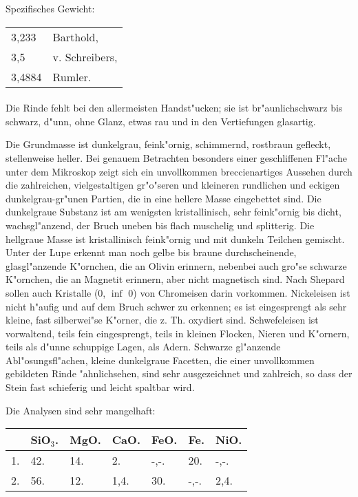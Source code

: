 \documentclass[a4paper, 11pt, oneside]{article}
\begin{document}
Spezifisches Gewicht:
\begin{table}[!ht]
    \centering
    \begin{tabular}{l l}
        3,233 & Barthold,\\
        3,5 & v. Schreibers,\\
        3,4884 & Rumler.
    \end{tabular}
\end{table}
\paragraph{}
Die Rinde fehlt bei den allermeisten Handst"ucken; sie ist br"aunlichschwarz bis schwarz, d"unn, ohne Glanz, etwas rau und in den Vertiefungen glasartig.

Die Grundmasse ist dunkelgrau, feink"ornig, schimmernd, rostbraun gefleckt, stellenweise heller. Bei genauem Betrachten besonders einer geschliffenen Fl"ache unter dem Mikroskop zeigt sich ein unvollkommen breccienartiges Aussehen durch die zahlreichen, vielgestaltigen gr"o"seren und kleineren rundlichen und eckigen dunkelgrau-gr"unen Partien, die in eine hellere Masse eingebettet sind. Die dunkelgraue Substanz ist am wenigsten kristallinisch, sehr feink"ornig bis dicht, wachsgl"anzend, der Bruch uneben bis flach muschelig und splitterig. Die hellgraue Masse ist kristallinisch feink"ornig und mit dunkeln Teilchen gemischt. Unter der Lupe erkennt man noch gelbe bis braune durchscheinende, glasgl"anzende K"ornchen, die an Olivin erinnern, nebenbei auch gro"se schwarze K"ornchen, die an Magnetit erinnern, aber nicht magnetisch sind. Nach Shepard sollen auch Kristalle (0, $\inf$ 0) von Chromeisen darin vorkommen. Nickeleisen ist nicht h"aufig und auf dem Bruch schwer zu erkennen; es ist eingesprengt als sehr kleine, fast silberwei"se K"orner, die z. Th. oxydiert sind. Schwefeleisen ist vorwaltend, teils fein eingesprengt, teils in kleinen Flocken, Nieren und K"ornern, teils als d"unne schuppige Lagen, als Adern. Schwarze gl"anzende Abl"osungsfl"achen, kleine dunkelgraue Facetten, die einer unvollkommen gebildeten Rinde "ahnlichsehen, sind sehr ausgezeichnet und zahlreich, so dass der Stein fast schieferig und leicht spaltbar wird.

Die Analysen sind sehr mangelhaft:
\begin{table}[!ht]
    \centering
    \begin{tabular}{l l l l l l l}
         & SiO$_{3}$. & MgO. & CaO. & FeO. & Fe. & NiO.\\ \hline
        1. & 42. & 14. & 2. & -,-. & 20. & -,-. \\
        2. & 56. & 12. & 1,4. & 30. & -,-. & 2,4. \\
    \end{tabular}
\end{table}
\end{document}
